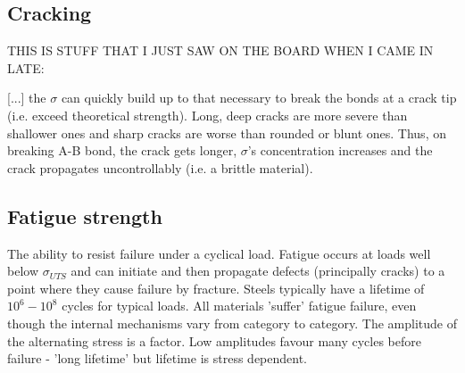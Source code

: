 \subsection{Cracking}
THIS IS STUFF THAT I JUST SAW ON THE BOARD WHEN I CAME IN LATE:

[...] the \(\sigma\) can quickly build up to that necessary to break the bonds at a crack tip (i.e. exceed theoretical strength). Long, deep cracks are more severe than shallower ones and sharp cracks are worse than rounded or blunt ones. Thus, on breaking A-B bond, the crack gets longer, \(\sigma\)'s concentration increases and the crack propagates uncontrollably (i.e. a brittle material).
\subsection{Fatigue strength}
The ability to resist failure under a cyclical load. Fatigue occurs at loads well below \(\sigma_{UTS}\) and can initiate and then propagate defects (principally cracks) to a point where they cause failure by fracture. Steels typically have a lifetime of \(10^6 - 10^8\) cycles for typical loads. All materials 'suffer' fatigue failure, even though the internal mechanisms vary from category to category. The amplitude of the alternating stress is a factor. Low amplitudes favour many cycles before failure - 'long lifetime' but lifetime is stress dependent.
